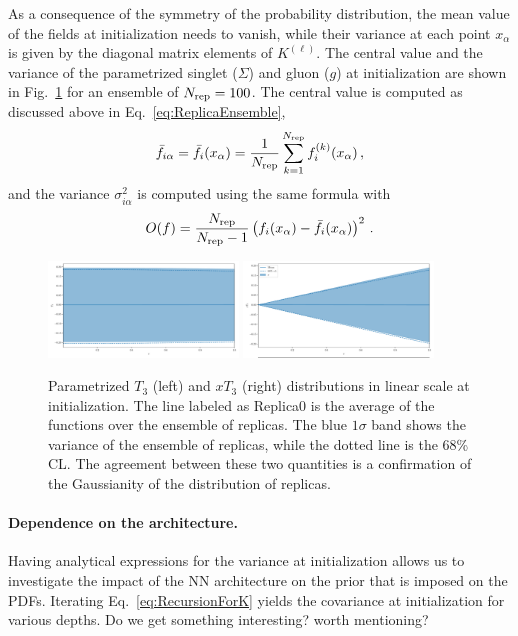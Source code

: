 \documentclass[11pt]{article}
\begin{document}
As a consequence of the symmetry of the probability distribution, the mean value of the fields at
initialization needs to vanish, while their variance at each point $x_\alpha$ is given by the
diagonal matrix elements of $K^{(\ell)}$. The central value and the variance of the
parametrized singlet ($\Sigma$) and gluon ($g$) at initialization are shown in
Fig.~\ref{fig:SingletGluonInit} for an ensemble of $N_{\rm rep}=100$. The central value is computed as
discussed above in Eq.~\eqref{eq:ReplicaEnsemble},
\begin{align}
    \label{eq:MeanValAtInit}
    \bar{f}_{i\alpha} = \bar{f}_{i}(x_\alpha) = \frac{1}{N_{\rm rep}} \sum_{k=1}^{N_{\rm rep}} f^{(k)}_i(x_\alpha)\, ,
\end{align}
and the variance $\sigma^2_{i\alpha}$ is computed using the same formula with
\begin{align}
    \label{eq:VarAtInit}
    O(f) = \frac{N_{\rm rep}}{N_{\rm rep}-1} \left(f_i(x_\alpha) - \bar{f}_{i}(x_\alpha)\right)^2\, .
\end{align}

\begin{figure}[!ht]
    \centering
    \includegraphics[width=0.45\textwidth]{plots/t3_lin_init.pdf}
    \includegraphics[width=0.45\textwidth]{plots/xt3_lin_init.pdf}
    \caption{Parametrized $T_3$ (left) and $xT_3$ (right) distributions in linear scale at initialization.
    The line labeled as Replica0 is the average of the functions over the ensemble of replicas. The blue $1\sigma$ band
    shows the variance of the ensemble of replicas, while the dotted line is the 68\% CL.
    The agreement between these two quantities is a confirmation of the Gaussianity of the
    distribution of replicas.
    \label{fig:SingletGluonInit}}
\end{figure}

\paragraph{Dependence on the architecture.}
Having analytical expressions for the variance at initialization allows us to investigate the
impact of the NN architecture on the prior that is imposed on the PDFs. Iterating
Eq.~\eqref{eq:RecursionForK} yields the covariance at initialization for various depths.
Do we get something interesting? worth mentioning?
\end{document}
